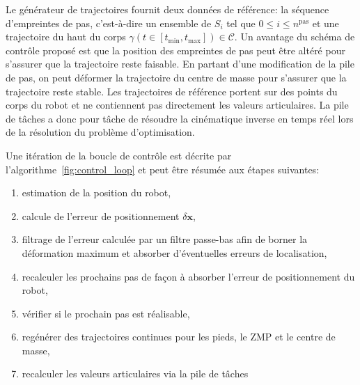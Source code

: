 Le générateur de trajectoires fournit deux données de référence: la
séquence d'empreintes de pas, c'est-à-dire un ensemble de $S_i$ tel
que \mbox{$0 \leq i \leq n^{\text{pas}}$} et une trajectoire du haut
du corps \mbox{$\gamma(t \in [t_{\text{min}}, t_{\text{max}}]) \in
  \mathcal{C}$}. Un avantage du schéma de contrôle proposé est que la
position des empreintes de pas peut être altéré pour s'assurer que la
trajectoire reste faisable. En partant d'une modification de la pile
de pas, on peut déformer la trajectoire du centre de masse pour
s'assurer que la trajectoire reste stable. Les trajectoires de
référence portent sur des points du corps du robot et ne contiennent
pas directement les valeurs articulaires. La pile de tâches a donc pour
tâche de résoudre la cinématique inverse en temps réel lors de la
résolution du problème d'optimisation.

Une itération de la boucle de contrôle est décrite par l'algorithme \ref{fig:control_loop} et peut être résumée aux étapes suivantes:

\begin{enumerate}
\item estimation de la position du robot,
\item calcule de l'erreur de positionnement \mbox{$\delta \mathbf{x}$},
\item filtrage de l'erreur calculée par un filtre passe-bas afin de
  borner la déformation maximum et absorber d'éventuelles erreurs de
  localisation,
\item recalculer les prochains pas de façon à absorber l'erreur de
  positionnement du robot,
\item vérifier si le prochain pas est réalisable,
\item regénérer des trajectoires continues pour les pieds, le ZMP et le centre de masse,
\item recalculer les valeurs articulaires via la pile de tâches
\end{enumerate}


